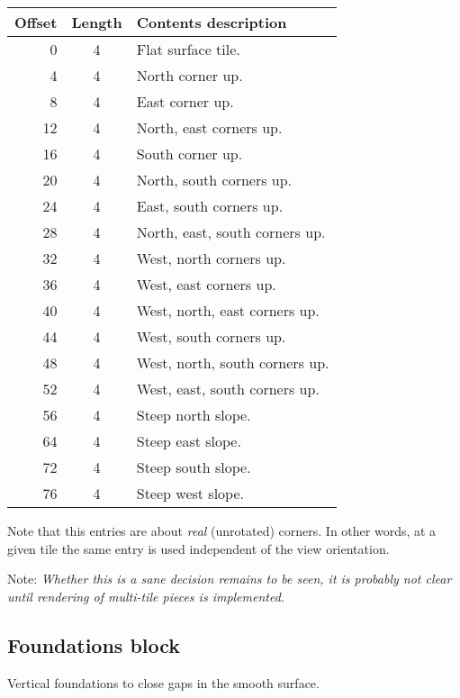 \documentclass{article}
\begin{document}
\begin{center}
\begin{tabular}{|r|c|l|} \hline
\textbf{Offset} & \textbf{Length} & \textbf{Contents description} \\ \hline
 0 & 4 & Flat surface tile. \\
 4 & 4 & North corner up. \\
 8 & 4 & East corner up. \\
12 & 4 & North, east corners up. \\
16 & 4 & South corner up. \\
20 & 4 & North, south corners up. \\
24 & 4 & East, south corners up. \\
28 & 4 & North, east, south corners up. \\
32 & 4 & West, north corners up. \\
36 & 4 & West, east corners up. \\
40 & 4 & West, north, east corners up. \\
44 & 4 & West, south corners up. \\
48 & 4 & West, north, south corners up. \\
52 & 4 & West, east, south corners up. \\
56 & 4 & Steep north slope. \\
64 & 4 & Steep east slope. \\
72 & 4 & Steep south slope. \\
76 & 4 & Steep west slope. \\ \hline
\end{tabular}
\end{center}
Note that this entries are about \textit{real} (unrotated) corners. In other
words, at a given tile the same entry is used independent of the view
orientation.

Note: \textit{Whether this is a sane decision remains to be seen, it is
probably not clear until rendering of multi-tile pieces is implemented.}

\subsection{Foundations block}
Vertical foundations to close gaps in the smooth surface.
\end{document}
